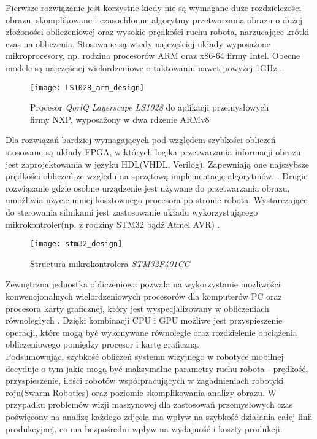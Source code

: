 \documentclass[document.tex]{subfiles}
\begin{document}
\indent Pierwsze rozwiązanie jest korzystne kiedy nie są wymagane duże rozdzielczości obrazu,
skomplikowane i czasochłonne algorytmy przetwarzania obrazu o dużej złożoności obliczeniowej
oraz wysokie prędkości ruchu robota, narzucające krótki czas na obliczenia. 
Stosowane są wtedy najczęściej układy wyposażone mikroprocesory, np. rodzina procesorów ARM oraz x86-64 firmy Intel. Obecne modele są najczęściej wielordzeniowe o taktowaniu nawet powyżej 1GHz
\cite{NXP_ARM} \cite{Intel_Embedded_Processors}.
\\
\begin{center}
	\begin{figure}[h]
	\texttt{[image: LS1028\_arm\_design]}
	\caption{Procesor \textit{QorlQ Layerscape LS1028} do aplikacji przemysłowych firmy NXP, 
	wyposażony w dwa rdzenie ARMv8\protect\cite{NXP_ARM}}
	\label{fig:arm_processor}
	\end{figure}
\end{center}	
Dla rozwiązań bardziej wymagających pod względem szybkości obliczeń stosowane są układy
FPGA, w których logika przetwarzania informacji obrazu jest zaprojektowania w języku
HDL(VHDL, Verilog). Zapewniają one najszybsze prędkości obliczeń ze względu na sprzętową implementację algorytmów. \cite{FPGA_Design}\cite{VHDL_FPGA}. 
\indent Drugie rozwiązanie gdzie osobne urządzenie jest używane do przetwarzania obrazu, umożliwia użycie mniej kosztownego procesora po stronie robota. Wystarczające do sterowania silnikami jest zastosowanie układu wykorzystującego mikrokontroler(np. z rodziny STM32 bądź Atmel AVR)\cite{STM32_microcontrollers} \cite{Atmel_microcontrollers}. 
\\
\begin{center}
	\begin{figure}[h]
	\texttt{[image: stm32\_design]}
	\caption{Structura mikrokontrolera \textit{STM32F401CC}\protect\cite{STM32_microcontrollers}}
	\label{fig:stm32}
	\end{figure}
\end{center}
Zewnętrzna jednostka obliczeniowa pozwala na wykorzystanie możliwości konwencjonalnych wielordzeniowych procesorów dla komputerów PC oraz procesora karty graficznej, który jest wyspecjalizowany w obliczeniach równoległych\cite{GPU_vs_CPU_nvidia} \cite{Computer_Architecture_Patterson_Hennesy}\cite{GPUs_Closer_Look}. 
Dzięki kombinacji CPU i GPU możliwe jest przyspieszenie operacji,
które mogą być wykonywane równolegle oraz rozdzielenie obciążenia obliczeniowego pomiędzy
procesor i kartę graficzną. \\
\indent Podsumowując, szybkość obliczeń systemu wizyjnego w robotyce mobilnej decyduje o tym jakie
mogą być maksymalne parametry ruchu robota - prędkość, przyspieszenie, ilości robotów współpracujących w zagadnieniach robotyki roju(Swarm Robotics) oraz poziomie skomplikowania
analizy obrazu. W przypadku problemów wizji maszynowej dla zastosowań przemysłowych czas poświęcony na analizę każdego zdjęcia ma wpływ na szybkość działania całej linii produkcyjnej, co ma bezpośredni wpływ na wydajność i koszty produkcji.  
\end{document}
